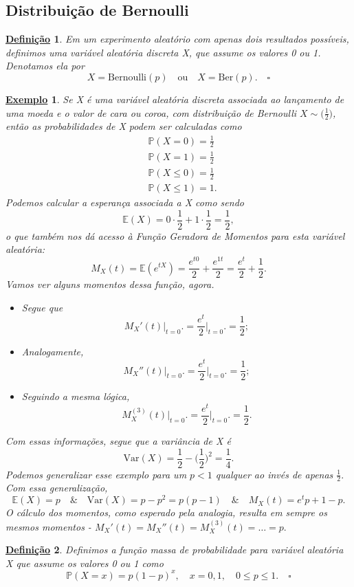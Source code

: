 \documentclass{article}
\newtheorem*{def*}{\underline{Defini\c c\~ao}}
\newtheorem{example}{\underline{Exemplo}}
\begin{document}
\subsection{Distribuição de Bernoulli}
\begin{def*}
  Em um experimento aleatório com apenas dois resultados possíveis, definimos uma variável aleatória discreta X, que assume os valores 0 ou 1. Denotamos ela por 
  \[
    X = \mathrm{Bernoulli}(p)\quad\text{ou}\quad X = \mathrm{Ber}(p). \quad\square
  \]
\end{def*}
\begin{example}
  Se X é uma variável aleatória discreta associada ao lançamento de uma moeda e o valor de cara ou coroa, com distribuição de Bernoulli \(X\sim \biggl(\frac{1}{2}\biggr)\), então as probabilidades de X podem ser calculadas como
  \begin{align*}
   &\mathbb{P}(X=0) = \frac{1}{2}\\
   &\mathbb{P}(X=1) = \frac{1}{2}\\
   &\mathbb{P}(X\leq 0) = \frac{1}{2}\\
   &\mathbb{P}(X\leq 1) = 1.
  \end{align*}
  Podemos calcular a esperança associada a X como sendo 
  \[
    \mathbb{E}(X) = 0 \cdot \frac{1}{2} + 1 \cdot \frac{1}{2} = \frac{1}{2},
  \]
  o que também nos dá acesso à Função Geradora de Momentos para esta variável aleatória:
  \[
    M_{X}(t) = \mathbb{E}(e^{tX}) = \frac{e^{t0}}{2} + \frac{e^{1t}}{2} = \frac{e^{t}}{2} + \frac{1}{2}.
  \]
  Vamos ver alguns momentos dessa função, agora.
  \begin{itemize}
    \item[\({1}^{\mathrm{o}}\)):] Segue que 
      \[
        M_{X}'(t)\biggl|_{t=0}^{}\biggr. = \frac{e^{t}}{2}\biggl|_{t=0}^{}\biggr. = \frac{1}{2};
      \]
    \item[\({2}^{\mathrm{o}}\)):] Analogamente, 
      \[
        M_{X}''(t)\biggl|_{t=0}^{}\biggr. = \frac{e^{t}}{2}\biggl|_{t=0}^{}\biggr. = \frac{1}{2};
      \]
    \item[\({3}^{\mathrm{o}}\)):] Seguindo a mesma lógica,
      \[
        M_{X}^{(3)}(t)\biggl|_{t=0}^{}\biggr. = \frac{e^{t}}{2}\biggl|_{t=0}^{}\biggr. = \frac{1}{2}.
      \]
  \end{itemize}
  Com essas informações, segue que a variância de X é 
  \[
    \mathrm{Var}(X) = \frac{1}{2} - \biggl(\frac{1}{2}\biggr)^{2} = \frac{1}{4}.
  \]
  Podemos generalizar esse exemplo para um \(p < 1\) qualquer ao invés de apenas \(\frac{1}{2}.\) Com essa generalização, 
  \[
    \mathbb{E}(X) = p\quad\&\quad \mathrm{Var}(X) = p - p^{2} = p(p-1)\quad\&\quad M_{X}(t) = e^{t}p + 1 - p.
  \]
  O cálculo dos momentos, como esperado pela analogia, resulta em sempre os mesmos momentos - \(M_{X}'(t) = M_{X}''(t) = M_{X}^{(3)}(t)=\dotsc = p.\)
\end{example}
\begin{def*}
  Definimos a função massa de probabilidade para variável aleatória X que assume os valores 0 ou 1 como
  \[
    \mathbb{P}(X=x) = p(1-p)^{x},\quad x=0, 1, \quad 0\leq p\leq 1.\quad \square
  \]
\end{def*}
\end{document}
